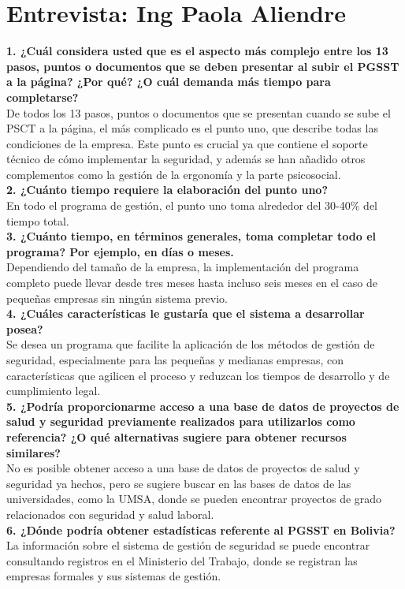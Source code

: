\chapter{Entrevista: Ing Paola Aliendre}\label{sec:entrevista01}

\noindent
\textbf{1. ¿Cuál considera usted que es el aspecto más complejo entre los 13 pasos, puntos o documentos que se deben presentar al subir el PGSST a la página? ¿Por qué? ¿O cuál demanda más tiempo para completarse?}\\
De todos los 13 pasos, puntos o documentos que se presentan cuando se sube el PSCT a la página, el más complicado es el punto uno, que describe todas las condiciones de la empresa. Este punto es crucial ya que contiene el soporte técnico de cómo implementar la seguridad, y además se han añadido otros complementos como la gestión de la ergonomía y la parte psicosocial.
\\
\noindent
\textbf{2. ¿Cuánto tiempo requiere la elaboración del punto uno?}\\
En todo el programa de gestión, el punto uno toma alrededor del 30-40\% del tiempo total.
\\
\noindent
\textbf{3. ¿Cuánto tiempo, en términos generales, toma completar todo el programa? Por ejemplo, en días o meses.}\\
Dependiendo del tamaño de la empresa, la implementación del programa completo puede llevar desde tres meses hasta incluso seis meses en el caso de pequeñas empresas sin ningún sistema previo.
\\
\noindent
\textbf{4. ¿Cuáles características le gustaría que el sistema a desarrollar posea?}\\
Se desea un programa que facilite la aplicación de los métodos de gestión de seguridad, especialmente para las pequeñas y medianas empresas, con características que agilicen el proceso y reduzcan los tiempos de desarrollo y de cumplimiento legal.
\\
\noindent
\textbf{5. ¿Podría proporcionarme acceso a una base de datos de proyectos de salud y seguridad previamente realizados para utilizarlos como referencia? ¿O qué alternativas sugiere para obtener recursos similares?}\\
No es posible obtener acceso a una base de datos de proyectos de salud y seguridad ya hechos, pero se sugiere buscar en las bases de datos de las universidades, como la UMSA, donde se pueden encontrar proyectos de grado relacionados con seguridad y salud laboral.
\\
\noindent
\textbf{6. ¿Dónde podría obtener estadísticas referente al PGSST en Bolivia?}\\
La información sobre el sistema de gestión de seguridad se puede encontrar consultando registros en el Ministerio del Trabajo, donde se registran las empresas formales y sus sistemas de gestión.
